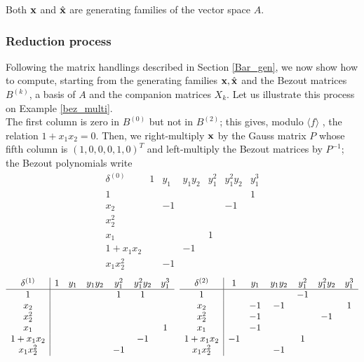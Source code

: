 \documentclass{standalone}
\begin{document}
\begin{prop}
Both $\bold{x}$ and $\hat{\bold{x}}$ are generating families of the vector space $A$.
\end{prop}

\subsubsection{Reduction process}
\label{sec:reduction_process}
Following the matrix handlings described in Section \ref{Bar_gen}, we now show how to compute, starting from the generating families $\bold{x}, \hat{\bold{x}}$ and the Bezout matrices $B^{(k)}$, a basis of $A$ and the companion matrices $X_k$.
Let us illustrate this process on Example \ref{bez_multi}.\\
The first column is zero in $B^{(0)}$ but not in $B^{(2)}$; this gives, modulo $\langle f \rangle$ , the relation $1 + x_1x_2 = 0$. Then, we right-multiply $\bold{x}$ by the Gauss matrix $P$ whose fifth column is $(1, 0, 0, 0, 1, 0)^{T}$ and left-multiply the Bezout matrices by $P^{-1}$; the Bezout polynomials write 
$$
\begin{array}{c|cccccc}
	\delta^{(0)} & 1 & y_1 & y_1y_2 & y_1^2 & y_1^2y_2 & y_1^3 \\
	\hline
	1 &  &  &  &  &  & 1\\
	x_2 &  & -1 &  &  & -1 & \\
	x_2^2 &  &  &  &  &  & \\
	x_1 &  &  &  & 1 &  & \\
	1+x_1x_2 &  &  & -1 &  &  & \\
	x_1x_2^2 &  & -1 &  &  &  &
\end{array}$$
$$
\begin{array}{c|cccccc}
	\delta^{(1)} & 1 & y_1 & y_1y_2 & y_1^2 & y_1^2y_2 & y_1^3 \\
	\hline
	1 &  &  &  & 1 & 1 & \\
	x_2 &  &  &  &  &  & \\
	x_2^2 &  &  &  &  &  & \\
	x_1 &  &  &  &  &  & 1\\
	1+x_1x_2 &  &  &  &  & -1 & \\
	x_1x_2^2 &  &  &  & -1 &  &
\end{array}
\hspace{0.2cm}
\begin{array}{c|cccccc}
	\delta^{(2)} & 1 & y_1 & y_1y_2 & y_1^2 & y_1^2y_2 & y_1^3 \\
	\hline
	1 &  &  &  & -1 &  & \\
	x_2 &  & -1 & -1 &  &  & 1\\
	x_2^2 &  & -1 &  &  & -1 & \\
	x_1 &  & -1 &  &  &  & \\
	1+x_1x_2 & -1 &  &  & 1 &  & \\
	x_1x_2^2 &  &  & -1 &  &  &
\end{array}
$$
\end{document}
